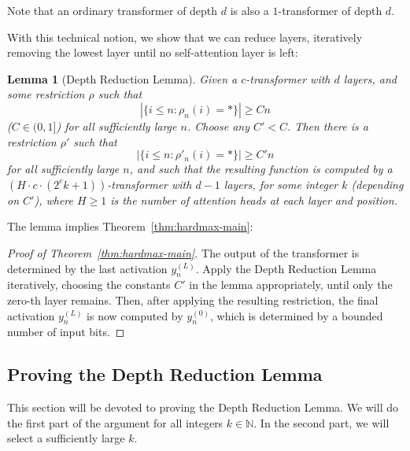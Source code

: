 \documentclass[11pt,a4paper]{article}
\newcounter{theorem}
\newtheorem{lemma}[theorem]{Lemma}
\begin{document}
Note that an ordinary transformer  of depth $d$ is also a $1$-transformer of depth $d$.

With this technical notion, we show that we can reduce layers, iteratively removing the lowest layer until no self-attention layer is left:
\begin{lemma}[Depth Reduction Lemma]\label{lemma:depth-red}
Given a $c$-transformer with $d$ layers, and some restriction $\rho$ such that
\begin{equation}
|\{i \leq n: \rho_n(i) = *\}| \geq Cn
\end{equation}
($C \in (0,1]$)
for all sufficiently large $n$.
Choose any $C' < C$.
Then there is a restriction $\rho'$ 
such that
\begin{equation}
|\{i \leq n: \rho'_n(i) = *\}| \geq C'n
\end{equation}
for all sufficiently large $n$, 
and such that the resulting function is computed by a $(H\cdot c\cdot(2^ck+1))$-transformer with $d-1$ layers, for some integer $k$ (depending on $C'$), where $H \geq 1$ is the number of attention heads at each layer and position.
\end{lemma}
The lemma implies Theorem~\ref{thm:hardmax-main}:
\begin{proof}[Proof of Theorem~\ref{thm:hardmax-main}]
The output of the transformer is determined by the last activation $y_{n}^{(L)}$.
Apply the Depth Reduction Lemma iteratively, choosing the constants $C'$ in the lemma appropriately, until only the zero-th layer remains.
Then, after applying the resulting restriction, the final activation $y_{n}^{(L)}$ is now computed by $y_{n}^{(0)}$, which is determined by a bounded number of input bits.
\end{proof}




\subsection{Proving the Depth Reduction Lemma}
This section will be devoted to proving the Depth Reduction Lemma.
We will do the first part of the argument for all integers $k \in \mathbb{N}$.
In the second part, we will select a sufficiently large $k$. %
\end{document}
